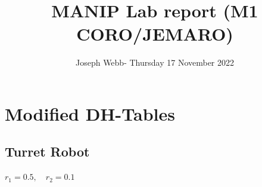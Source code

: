 \documentclass[11pt, oneside]{article}   	%
\title{MANIP Lab report (M1 CORO/JEMARO)}
\author{Joseph Webb\quad - \quad Thursday 17 November 2022}
\date{}							%
\begin{document}
\maketitle
\section{Modified DH-Tables}

\subsection{Turret Robot}

$r_1 = 0.5, \quad r_2 = 0.1$


\begin{figure}[H]
\begin{floatrow}
\end{floatrow}
\end{figure}
\end{document}
